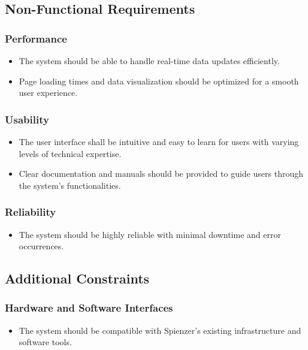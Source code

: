 \documentclass[12pt]{article}
\begin{document}
\subsection{Non-Functional Requirements}

\subsubsection{Performance}
\begin{itemize}
    \item The system should be able to handle real-time data updates efficiently.
    \item Page loading times and data visualization should be optimized for a smooth user experience.
\end{itemize}

\subsubsection{Usability}
\begin{itemize}
    \item The user interface shall be intuitive and easy to learn for users with varying levels of technical expertise.
    \item Clear documentation and manuals should be provided to guide users through the system's functionalities.
\end{itemize}

\subsubsection{Reliability}
\begin{itemize}
    \item The system should be highly reliable with minimal downtime and error occurrences.
\end{itemize}

\subsection{Additional Constraints}

\subsubsection{Hardware and Software Interfaces}
\begin{itemize}
    \item The system should be compatible with Spienzer's existing infrastructure and software tools.
\end{itemize}
\end{document}

